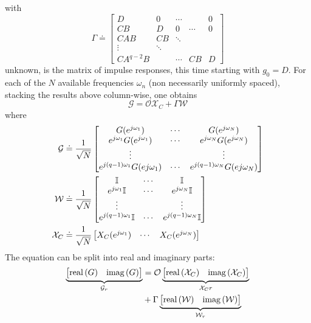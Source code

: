 with
\begin{equation*}
  \Gamma \doteq
  \begin{bmatrix}
    D & 0 & \cdots & & 0 \\
    CB & D & 0 & \cdots & 0 \\
    CAB & CB & \ddots \\
    \vdots & \ddots \\
    CA^{q-2}B & & \cdots & CB & D
  \end{bmatrix}
\end{equation*}
unknown, is the matrix of impulse responses, this time starting with $g_0=D$. For each of the $N$ available frequencies $\omega_n$ (non necessarily uniformly spaced), stacking the results above column-wise, one obtains
\begin{equation}
  \label{eq:subpace-indentification-nonuniformly}
  \mathcal{G} = \mathcal{O}\mathcal{X}_C + \Gamma \mathcal{W}
\end{equation}
where
\begin{align*}
  \mathcal{G} &\doteq \frac{1}{\sqrt{N}}
  \begin{bmatrix}
    G(e^{j\omega_1}) & \cdots & G(e^{j\omega_N}) \\
    e^{j\omega_1}G(e^{j\omega_1}) & \cdots & e^{j\omega_N}G(e^{j\omega_N}) \\
    \vdots & & \vdots \\
    e^{j(q-1)\omega_1}G(e{j\omega_1}) & \cdots & e^{j(q-1)\omega_N}G(e{j\omega_N})
  \end{bmatrix} \\
  \mathcal{W} &\doteq \frac{1}{\sqrt{N}}
                \begin{bmatrix}
                  \mathbb{I} & \cdots & \mathbb{I} \\
                  e^{j\omega_1} \mathbb{I} & \cdots & e^{j\omega_N} \mathbb{I} \\
                  \vdots & & \vdots \\
                  e^{j(q-1)\omega_1} \mathbb{I} & \cdots & e^{j(q-1)\omega_N} \mathbb{I}
                \end{bmatrix} \\
  \mathcal{X}_C &\doteq \frac{1}{\sqrt{N}}
                  \begin{bmatrix}
                    X_C(e^{j\omega_1}) & \cdots & X_C(e^{j\omega_N})
                  \end{bmatrix}
\end{align*}
The equation can be split into real and imaginary parts:
\begin{align*}
  \underbrace{\begin{bmatrix}
    \textrm{real}\left(G\right) & \textrm{imag}\left(G\right)
  \end{bmatrix}}_{\mathcal{G}_r} &= \mathcal{O}
  \underbrace{\begin{bmatrix}
    \textrm{real}\left(\mathcal{X}_C\right) & \textrm{imag}\left(\mathcal{X}_C\right)
  \end{bmatrix}}_{\mathcal{X}_Cr} \\
             &+ \Gamma
  \underbrace{\begin{bmatrix}
    \textrm{real}\left(\mathcal{W}\right) & \textrm{imag}\left(\mathcal{W}\right)
  \end{bmatrix}}_{\mathcal{W}_r}
\end{align*}
